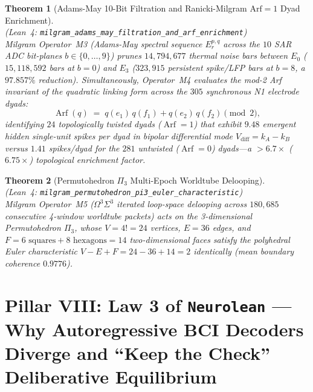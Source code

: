 \documentclass[11pt,letterpaper]{article}
\newcommand{\lean}[1]{\nolinkurl{#1}}
\newtheorem{theorem}{Theorem}[section]
\theoremstyle{definition}
\begin{document}
\begin{theorem}[Adams-May 10-Bit Filtration and Ranicki-Milgram $\mathrm{Arf}=1$ Dyad Enrichment]
\label{thm:t20}
~\\
(\emph{Lean~4:} \lean{milgram_adams_may_filtration_and_arf_enrichment})\\
Milgram Operator~M3 (Adams-May spectral sequence $E_r^{p,q}$ across the $10$ SAR ADC bit-planes $b \in \{0,\dots,9\}$) prunes $14{,}794{,}677$ thermal noise bars between $E_0$ ($15{,}118{,}592$ bars at $b=0$) and $E_3$ ($323{,}915$ persistent spike/LFP bars at $b=8$, a $97.857\%$ reduction). Simultaneously, Operator~M4 evaluates the mod-2 Arf invariant of the quadratic linking form across the $305$ synchronous N1 electrode dyads:
\begin{equation}
\label{eq:t20_arf}
\operatorname{Arf}(q) \;=\; q(e_1)\,q(f_1) + q(e_2)\,q(f_2) \pmod 2,
\end{equation}
identifying $24$ topologically twisted dyads ($\operatorname{Arf}=1$) that exhibit $9.48$ emergent hidden single-unit spikes per dyad in bipolar differential mode $V_{\mathrm{diff}} = k_A - k_B$ versus $1.41$ spikes/dyad for the $281$ untwisted ($\operatorname{Arf}=0$) dyads---a $>6.7\times$ ($6.75\times$) topological enrichment factor.
\end{theorem}

\begin{theorem}[Permutohedron $\Pi_3$ Multi-Epoch Worldtube Delooping]
\label{thm:t21}
~\\
(\emph{Lean~4:} \lean{milgram_permutohedron_pi3_euler_characteristic})\\
Milgram Operator~M5 ($\Omega^3\Sigma^3$ iterated loop-space delooping across $180{,}685$ consecutive 4-window worldtube packets) acts on the 3-dimensional Permutohedron $\Pi_3$, whose $V = 4! = 24$ vertices, $E = 36$ edges, and $F = 6\text{ squares} + 8\text{ hexagons} = 14$ two-dimensional faces satisfy the polyhedral Euler characteristic $V - E + F = 24 - 36 + 14 = 2$ identically (mean boundary coherence $0.9776$).
\end{theorem}

\section[Pillar VIII: Law 3 of Neurolean --- Keep the Check Deliberative Equilibrium]{Pillar VIII: Law 3 of \texttt{Neurolean} --- Why Autoregressive BCI Decoders Diverge and ``Keep the Check'' Deliberative Equilibrium}
\end{document}
